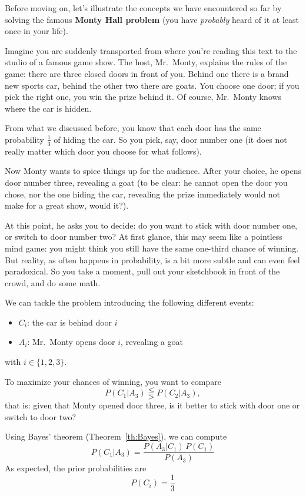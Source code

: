 \begin{example}
	Before moving on, let's illustrate the concepts we have encountered so far by solving the famous \textbf{Monty Hall problem} (you have \emph{probably} heard of it at least once in your life).
	
	Imagine you are suddenly transported from where you're reading this text to the studio of a famous game show. The host, Mr.~Monty, explains the rules of the game: there are three closed doors in front of you. Behind one there is a brand new sports car, behind the other two there are goats. You choose one door; if you pick the right one, you win the prize behind it. Of course, Mr.~Monty knows where the car is hidden.
	
	From what we discussed before, you know that each door has the same probability $\frac{1}{3}$ of hiding the car. So you pick, say, door number one (it does not really matter which door you choose for what follows).
	
	Now Monty wants to spice things up for the audience. After your choice, he opens door number three, revealing a goat (to be clear: he cannot open the door you chose, nor the one hiding the car, revealing the prize immediately would not make for a great show, would it?).
	
	At this point, he asks you to decide: do you want to stick with door number one, or switch to door number two?
	At first glance, this may seem like a pointless mind game: you might think you still have the same one-third chance of winning. But reality, as often happens in probability, is a bit more subtle and can even feel paradoxical. So you take a moment, pull out your sketchbook in front of the crowd, and do some math.
	
	We can tackle the problem introducing the following different events:
	\begin{itemize}
		\item $C_i$: the car is behind door $i$
		\item $A_i$: Mr.~Monty opens door $i$, revealing a goat
	\end{itemize}
	with $i \in \{1,2,3\}$.
	
	To maximize your chances of winning, you want to compare
	\[
	P(C_1|A_3)\lesseqqgtr P(C_2|A_3),
	\]
	that is: given that Monty opened door three, is it better to stick with door one or switch to door two?
	
	Using Bayes' theorem (Theorem~\ref{th:Bayes}), we can compute
	\[
	P(C_1|A_3)=\frac{P(A_3|C_1)\,P(C_1)}{P(A_3)}
	\]
	As expected, the prior probabilities are
	\[
	P(C_i)=\frac{1}{3}
	\]
	

\end{example}
